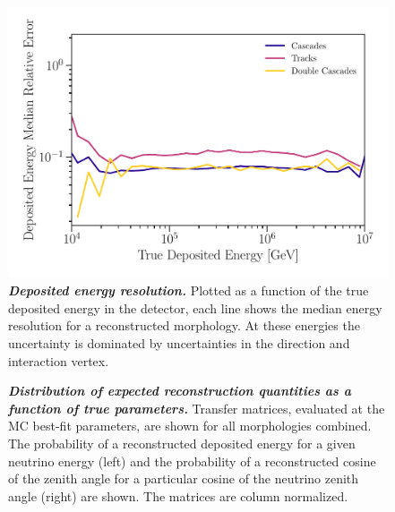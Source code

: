 \begin{figure}
	\centering
	\includegraphics[width=\linewidth]{figures/hese_paper/energy_resolution}
	\internallinenumbers
	\caption{\textbf{\textit{Deposited energy resolution.}} Plotted as a function of the true deposited energy in the detector, each line shows the median energy resolution for a reconstructed morphology.
		At these energies the uncertainty is dominated by uncertainties in the direction and interaction vertex.
	}\label{fig:energy_resolution}
\end{figure}

\begin{figure}
	\centering
	\internallinenumbers
	\caption{\textbf{\textit{Distribution of expected reconstruction quantities as a function of true parameters.}} Transfer matrices, evaluated at the MC best-fit parameters, are shown for all morphologies combined.
		The probability of a reconstructed deposited energy for a given neutrino energy (left) and the probability of a reconstructed cosine of the zenith angle for a particular cosine of the neutrino zenith angle (right) are shown.
		The matrices are column normalized.}\label{fig:transfer_matrices}
\end{figure}

